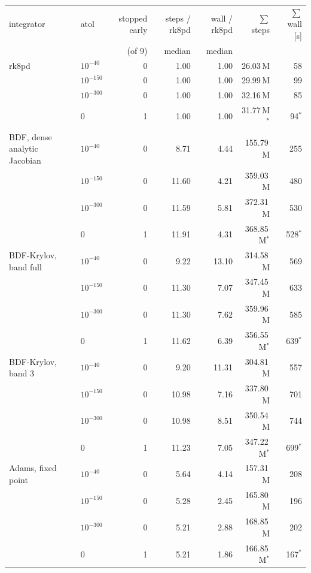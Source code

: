 \begin{tabular}{@{}llrrrrr@{}}
\toprule
integrator & atol & stopped early & steps / rk8pd & wall / rk8pd & $\sum$ steps & $\sum$ wall [s] \\
 & & (of 9) & median & median & & \\
\midrule
rk8pd & $10^{-40}$ & 0 & 1.00 & 1.00 & 26.03\,M & 58 \\
 & $10^{-150}$ & 0 & 1.00 & 1.00 & 29.99\,M & 99 \\
 & $10^{-300}$ & 0 & 1.00 & 1.00 & 32.16\,M & 85 \\
 & $0$ & 1 & 1.00 & 1.00 & 31.77\,M$^*$ & 94$^*$ \\
\addlinespace[2pt]
BDF, dense analytic Jacobian & $10^{-40}$ & 0 & 8.71 & 4.44 & 155.79\,M & 255 \\
 & $10^{-150}$ & 0 & 11.60 & 4.21 & 359.03\,M & 480 \\
 & $10^{-300}$ & 0 & 11.59 & 5.81 & 372.31\,M & 530 \\
 & $0$ & 1 & 11.91 & 4.31 & 368.85\,M$^*$ & 528$^*$ \\
\addlinespace[2pt]
BDF-Krylov, band full & $10^{-40}$ & 0 & 9.22 & 13.10 & 314.58\,M & 569 \\
 & $10^{-150}$ & 0 & 11.30 & 7.07 & 347.45\,M & 633 \\
 & $10^{-300}$ & 0 & 11.30 & 7.62 & 359.96\,M & 585 \\
 & $0$ & 1 & 11.62 & 6.39 & 356.55\,M$^*$ & 639$^*$ \\
\addlinespace[2pt]
BDF-Krylov, band 3 & $10^{-40}$ & 0 & 9.20 & 11.31 & 304.81\,M & 557 \\
 & $10^{-150}$ & 0 & 10.98 & 7.16 & 337.80\,M & 701 \\
 & $10^{-300}$ & 0 & 10.98 & 8.51 & 350.54\,M & 744 \\
 & $0$ & 1 & 11.23 & 7.05 & 347.22\,M$^*$ & 699$^*$ \\
\addlinespace[2pt]
Adams, fixed point & $10^{-40}$ & 0 & 5.64 & 4.14 & 157.31\,M & 208 \\
 & $10^{-150}$ & 0 & 5.28 & 2.45 & 165.80\,M & 196 \\
 & $10^{-300}$ & 0 & 5.21 & 2.88 & 168.85\,M & 202 \\
 & $0$ & 1 & 5.21 & 1.86 & 166.85\,M$^*$ & 167$^*$ \\
\bottomrule
\end{tabular}